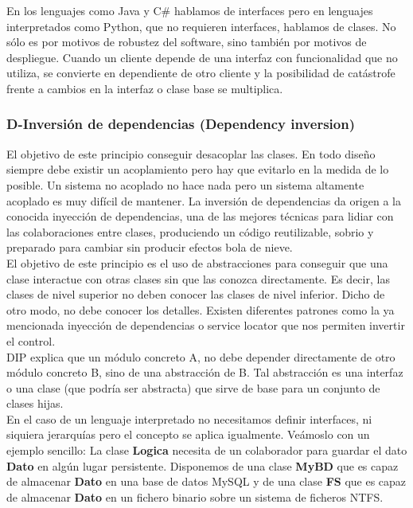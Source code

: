 \documentclass[../pfc.tex]{subfiles}
\begin{document}
	En los lenguajes como Java y C\# hablamos de interfaces pero en lenguajes interpretados como Python, que no requieren interfaces, hablamos de clases. No sólo es por motivos de robustez del software, sino también por motivos de despliegue. Cuando un cliente depende de una interfaz con funcionalidad que no utiliza, se convierte en dependiente de otro cliente y la posibilidad de catástrofe frente a cambios en la interfaz o clase base se multiplica.\\
	
	
	\subsubsection{D-Inversión de dependencias (Dependency inversion)}
	
	El objetivo de este principio conseguir desacoplar las clases. En todo diseño siempre debe existir un acoplamiento pero hay que evitarlo en la medida de lo posible. Un sistema no acoplado no hace nada pero un sistema altamente acoplado es muy difícil de mantener. La inversión de dependencias da origen a la conocida inyección de dependencias, una de las mejores técnicas para lidiar con las colaboraciones entre clases, produciendo un código reutilizable, sobrio y preparado para cambiar sin producir efectos bola de nieve.\\
	
	El objetivo de este principio es el uso de abstracciones para conseguir que una clase interactue con otras clases sin que las conozca directamente. Es decir, las clases de nivel superior no deben conocer las clases de nivel inferior. Dicho de otro modo, no debe conocer los detalles. Existen diferentes patrones como la ya mencionada inyección de dependencias o service locator que nos permiten invertir el control.\\
		
	DIP explica que un módulo concreto A, no debe depender directamente de otro módulo concreto B, sino de una abstracción de B. Tal abstracción es una interfaz o una clase (que podría ser abstracta) que sirve de base para un conjunto de clases hijas.\\
	
	En el caso de un lenguaje interpretado no necesitamos definir interfaces, ni siquiera jerarquías pero el concepto se aplica igualmente. Veámoslo con un ejemplo sencillo: La clase \textbf{Logica} necesita de un colaborador para guardar el dato \textbf{Dato} en algún lugar persistente. Disponemos de una clase \textbf{MyBD} que es capaz de almacenar \textbf{Dato} en una base de datos MySQL y de una clase \textbf{FS} que es capaz de almacenar \textbf{Dato} en un fichero binario sobre un sistema de ficheros NTFS.\\
	
\end{document}
